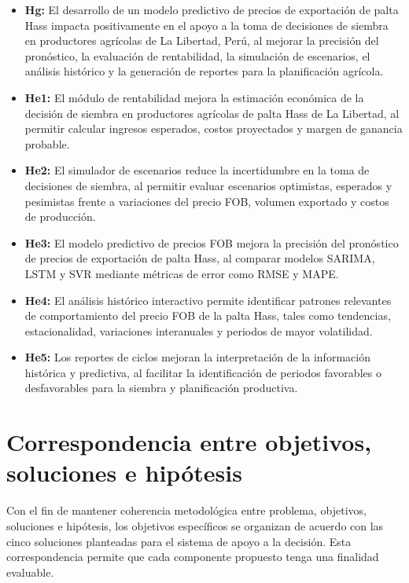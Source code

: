 \begin{itemize}
  \item \textbf{Hg:} El desarrollo de un modelo predictivo de precios de exportaci\'on de palta Hass impacta positivamente en el apoyo a la toma de decisiones de siembra en productores agr\'icolas de La Libertad, Per\'u, al mejorar la precisi\'on del pron\'ostico, la evaluaci\'on de rentabilidad, la simulaci\'on de escenarios, el an\'alisis hist\'orico y la generaci\'on de reportes para la planificaci\'on agr\'icola.
  \item \textbf{He1:} El m\'odulo de rentabilidad mejora la estimaci\'on econ\'omica de la decisi\'on de siembra en productores agr\'icolas de palta Hass de La Libertad, al permitir calcular ingresos esperados, costos proyectados y margen de ganancia probable.
  \item \textbf{He2:} El simulador de escenarios reduce la incertidumbre en la toma de decisiones de siembra, al permitir evaluar escenarios optimistas, esperados y pesimistas frente a variaciones del precio FOB, volumen exportado y costos de producci\'on.
  \item \textbf{He3:} El modelo predictivo de precios FOB mejora la precisi\'on del pron\'ostico de precios de exportaci\'on de palta Hass, al comparar modelos SARIMA, LSTM y SVR mediante m\'etricas de error como RMSE y MAPE.
  \item \textbf{He4:} El an\'alisis hist\'orico interactivo permite identificar patrones relevantes de comportamiento del precio FOB de la palta Hass, tales como tendencias, estacionalidad, variaciones interanuales y periodos de mayor volatilidad.
  \item \textbf{He5:} Los reportes de ciclos mejoran la interpretaci\'on de la informaci\'on hist\'orica y predictiva, al facilitar la identificaci\'on de periodos favorables o desfavorables para la siembra y planificaci\'on productiva.
\end{itemize}

\section{Correspondencia entre objetivos, soluciones e hip\'otesis}

Con el fin de mantener coherencia metodol\'ogica entre problema, objetivos, soluciones e hip\'otesis, los objetivos espec\'ificos se organizan de acuerdo con las cinco soluciones planteadas para el sistema de apoyo a la decisi\'on. Esta correspondencia permite que cada componente propuesto tenga una finalidad evaluable.

